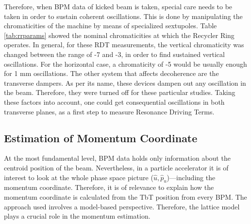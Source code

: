 Therefore, when BPM data of kicked beam is taken, special care needs to be taken in order to sustain coherent oscillations. This is done by manipulating the chromaticities of the machine by means of specialized sextupoles. Table \ref{tab:rrparams} showed the nominal chromaticities at which the Recycler Ring operates. In general, for these RDT measurements, the vertical chromaticity was changed between the range of -7 and -3, in order to find sustained vertical oscillations. For the horizontal case, a chromaticity of -5 would be usually enough for 1 mm oscillations. The other system that affects decoherence are the transverse dampers. As per its name, these devices dampen out any oscillation in the beam. Therefore, they were turned off for these particular studies. Taking these factors into account, one could get consequential oscillations in both transverse planes, as a first step to measure Resonance Driving Terms.      

\subsection{Estimation of Momentum Coordinate}

At the most fundamental level, BPM data holds only information about the centroid position of the beam. Nevertheless, in a particle accelerator it is of interest to look at the whole phase space picture ($\hat{u},\hat{p}_u$)---including the momentum coordinate. Therefore, it is of relevance to explain how the momentum coordinate is calculated from the TbT position from every BPM. The approach used involves a model-based perspective. Therefore, the lattice model plays a crucial role in the momentum estimation.    

